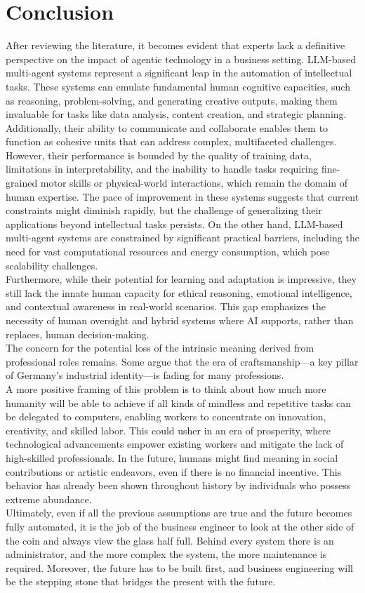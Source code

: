 \section{Conclusion}
After reviewing the literature, it becomes evident that experts lack a definitive perspective on the impact of agentic technology in a business setting. LLM-based multi-agent systems represent a significant leap in the automation of intellectual tasks. These systems can emulate fundamental human cognitive capacities, such as reasoning, problem-solving, and generating creative outputs, making them invaluable for tasks like data analysis, content creation, and strategic planning. Additionally, their ability to communicate and collaborate enables them to function as cohesive units that can address complex, multifaceted challenges. \\
However, their performance is bounded by the quality of training data, limitations in interpretability, and the inability to handle tasks requiring fine-grained motor skills or physical-world interactions, which remain the domain of human expertise. The pace of improvement in these systems suggests that current constraints might diminish rapidly, but the challenge of generalizing their applications beyond intellectual tasks persists. On the other hand, LLM-based multi-agent systems are constrained by significant practical barriers, including the need for vast computational resources and energy consumption, which pose scalability challenges. \\
Furthermore, while their potential for learning and adaptation is impressive, they still lack the innate human capacity for ethical reasoning, emotional intelligence, and contextual awareness in real-world scenarios. This gap emphasizes the necessity of human oversight and hybrid systems where AI supports, rather than replaces, human decision-making.\\
The concern for the potential loss of the intrinsic meaning derived from professional roles remains. Some argue that the era of craftsmanship—a key pillar of Germany's industrial identity—is fading for many professions. \\
A more positive framing of this problem is to think about how much more humanity will be able to achieve if all kinds of mindless and repetitive tasks can be delegated to computers, enabling workers to concentrate on innovation, creativity, and skilled labor. This could usher in an era of prosperity, where technological advancements empower existing workers and mitigate the lack of high-skilled professionals. In the future, humans might find meaning in social contributions or artistic endeavors, even if there is no financial incentive. This behavior has already been shown throughout history by individuals who possess extreme abundance.\\
Ultimately, even if all the previous assumptions are true and the future becomes fully automated, it is the job of the business engineer to look at the other side of the coin and always view the glass half full. Behind every system there is an administrator, and the more complex the system, the more maintenance is required. Moreover, the future has to be built first, and business engineering will be the stepping stone that bridges the present with the future.
